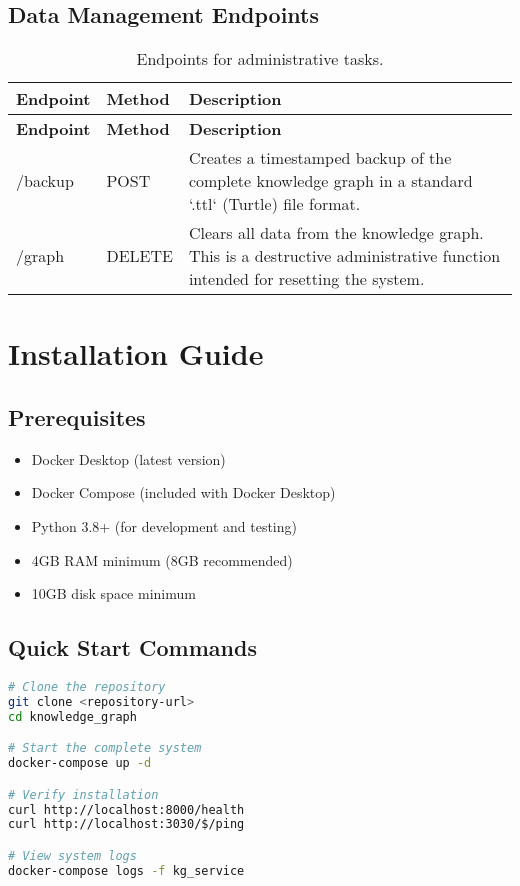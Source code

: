 \documentclass[12pt,a4paper]{article}
\begin{document}
\subsection{Data Management Endpoints}
\begin{longtable}{@{}p{3cm} p{2cm} p{8cm}@{}}
\caption{Endpoints for administrative tasks.} \\
\toprule
\textbf{Endpoint} & \textbf{Method} & \textbf{Description} \\
\midrule
\endfirsthead
\toprule
\textbf{Endpoint} & \textbf{Method} & \textbf{Description} \\
\midrule
\endhead
\bottomrule
\endfoot
/backup & POST & Creates a timestamped backup of the complete knowledge graph in a standard `.ttl` (Turtle) file format. \\
\hline
/graph & DELETE & Clears all data from the knowledge graph. This is a destructive administrative function intended for resetting the system. \\
\end{longtable}


\section{Installation Guide}
\subsection{Prerequisites}
\begin{itemize}
    \item Docker Desktop (latest version)
    \item Docker Compose (included with Docker Desktop)
    \item Python 3.8+ (for development and testing)
    \item 4GB RAM minimum (8GB recommended)
    \item 10GB disk space minimum
\end{itemize}

\subsection{Quick Start Commands}
\begin{lstlisting}[language=bash,caption=System Installation Commands]
# Clone the repository
git clone <repository-url>
cd knowledge_graph

# Start the complete system
docker-compose up -d

# Verify installation
curl http://localhost:8000/health
curl http://localhost:3030/$/ping

# View system logs
docker-compose logs -f kg_service
\end{lstlisting}
\end{document}
